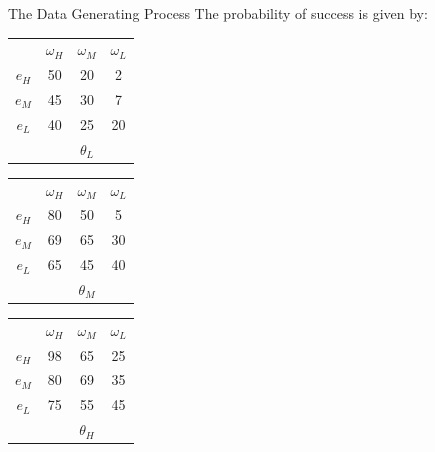 \documentclass[aspectratio=169]{beamer}
\begin{document}
\begin{frame}{The Data Generating Process}
    The probability of success is given by:\\
    \bigskip
    \centering
    \begin{tabular}{ c|c|c|c|}
    
    \multicolumn{1}{c}{} & \multicolumn{1}{c}{$\omega_H$} & \multicolumn{1}{c}{$\omega_M$} & \multicolumn{1}{c}{$\omega_L$}\\
    \cline{2-4}
    $e_H$ & 50 & 20 & 2 \\
    \cline{2-4}
    $e_M$ & 45 & 30 & 7 \\
    \cline{2-4}
    $e_L$ & 40 & 25 & 20 \\
    \cline{2-4}
    \multicolumn{1}{c}{} & \multicolumn{1}{c}{} & \multicolumn{1}{c}{$\theta_L$} & \multicolumn{1}{c}{}\\
    \end{tabular}
    \hspace{.3cm} %
    \begin{tabular}{ c|c|c|c|}
    
    \multicolumn{1}{c}{} & \multicolumn{1}{c}{$\omega_H$} & \multicolumn{1}{c}{$\omega_M$} & \multicolumn{1}{c}{$\omega_L$}\\
    \cline{2-4}
    $e_H$ & 80 & 50 & 5 \\
    \cline{2-4}
    $e_M$ & 69 & 65 & 30 \\
    \cline{2-4}
    $e_L$ & 65 & 45 & 40 \\
    \cline{2-4}
    \multicolumn{1}{c}{} & \multicolumn{1}{c}{} & \multicolumn{1}{c}{$\theta_M$} & \multicolumn{1}{c}{}\\
    \end{tabular}
    \hspace{.3cm} %
    \begin{tabular}{ c|c|c|c|}
    
    \multicolumn{1}{c}{} & \multicolumn{1}{c}{$\omega_H$} & \multicolumn{1}{c}{$\omega_M$} & \multicolumn{1}{c}{$\omega_L$}\\
    \cline{2-4}
    $e_H$ & 98 & 65 & 25 \\
    \cline{2-4}
    $e_M$ & 80 & 69 & 35 \\
    \cline{2-4}
    $e_L$ & 75 & 55 & 45 \\
    \cline{2-4}
    \multicolumn{1}{c}{} & \multicolumn{1}{c}{} & \multicolumn{1}{c}{$\theta_H$} & \multicolumn{1}{c}{}\\
    \end{tabular}

\end{frame}
\end{document}
